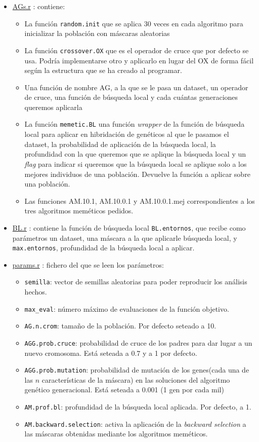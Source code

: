\documentclass[a4paper,11pt]{article}
\newcommand{\hrefr}[1]{
\href{../bin/#1}{#1}
}
\begin{document}
\begin{itemize}
 \item \hrefr{AGs.r}: contiene:
  \begin{itemize}
   \item La función \texttt{random.init} que se aplica 30 veces en cada algoritmo para inicializar la
 población con máscaras aleatorias
   \item La función \texttt{crossover.OX} que es el operador de cruce que por defecto se usa. Podría implementarse otro y
   aplicarlo en lugar del OX de forma fácil según la estructura que se ha creado al programar.
   \item Una función de nombre AG, a la que se le pasa un dataset, un operador de cruce, una función de búsqueda local y
   cada cuántas generaciones queremos aplicarla
   \item La función \texttt{memetic.BL} una función \textit{wrapper} de la función de búsqueda local para aplicar en 
   hibridación de genéticos al que le pasamos el dataset, la probabilidad de aplicación de la búsqueda local, 
   la profundidad con la que queremos que se aplique la búsqueda local y un \textit{flag} para indicar si queremos que la
   búsqueda local se aplique solo a los mejores individuos de una población. Devuelve la función a aplicar sobre una población.
   \item Las funciones AM.10.1, AM.10.0.1 y AM.10.0.1.mej correspondientes a los tres algoritmos meméticos pedidos.
  \end{itemize}
  
 \item \hrefr{BL.r}: contiene la función de búsqueda local \texttt{BL.entornos}, que recibe como parámetros un dataset,
 una máscara a la que aplicarle búsqueda local, y \texttt{max.entornos}, profundidad de la búsqueda local a aplicar.

 
 \item \hrefr{params.r}: fichero del que se leen los parámetros:
  \begin{itemize}
    \item \texttt{semilla}: vector de semillas aleatorias para poder reproducir los análisis hechos.
    \item \texttt{max\_eval}: número máximo de evaluaciones de la función objetivo.
    \item \texttt{AG.n.crom}: tamaño de la población. Por defecto seteado a 10.
    \item \texttt{AGG.prob.cruce}: probabilidad de cruce de los padres para dar lugar a un nuevo cromosoma. 
    Está seteada a 0.7 y a 1 por defecto.
    \item \texttt{AGG.prob.mutation}: probabilidad de mutación de los genes(cada una de las $n$ características
    de la máscara) en las soluciones del algoritmo genético generacional. Está seteada a 0.001 (1 gen por cada mil)
    \item \texttt{AM.prof.bl}: profundidad de la búsqueda local aplicada. Por defecto, a 1.
    \item \texttt{AM.backward.selection}: activa la aplicación de la \textit{backward selection} a las máscaras obtenidas
    mediante los algoritmos meméticos.
  \end{itemize}
  

\end{itemize}
\end{document}
